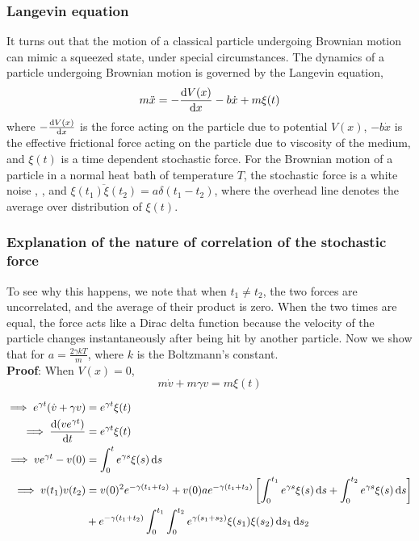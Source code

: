 \documentclass[12pt, twoside]{article}
\begin{document}
\subsubsection{Langevin equation}
It turns out that the motion of a classical particle undergoing Brownian motion can mimic a squeezed state, under special circumstances. The dynamics of a particle undergoing Brownian motion is governed by the Langevin equation,\begin{equation}\label{eq:Langevin}m \ddot{x} = -\derivative{V(x)}{x} - b \dot{x} + m \xi(t)\end{equation} where $-\derivative{V(x)}{x}$ is the force acting on the particle due to potential $V(x)$, $-b\dot{x}$ is the effective frictional force acting on the particle due to viscosity of the medium, and $\xi(t)$ is a time dependent stochastic force.
For the Brownian motion of a particle in a normal heat bath of temperature $T$, the stochastic force is a white noise \cite{wikipedia_white_noise}, \cite{brownian_motion_riemann}, and $\overline{\xi(t_1)\xi(t_2)} = a \delta(t_1 - t_2)$, where the overhead line denotes the average over distribution of $\xi(t)$.
\subsubsection{Explanation of the nature of correlation of the stochastic force}\label{fluctuation_dissipation_proof} To see why this happens, we note that when $t_1 \neq t_2$, the two forces are uncorrelated, and the average of their product is zero. When the two times are equal, the force acts like a Dirac delta function because the velocity of the particle changes instantaneously after being hit by another particle. Now we show that for $a = \frac{2 \gamma k T}{m}$, where $k$ is the Boltzmann's constant.\\
\textbf{Proof}: When $V(x) = 0$,\begin{equation}\label{eq:lang_no_pot}
	m\dot{v}+m\gamma v = m \xi(t)
\end{equation} 

$\begin{aligned}\implies e^{\gamma t}(\dot{v}+\gamma v) &= e^{\gamma t} \xi(t) \\ \implies \derivative{(ve^{\gamma t})}{t} &= e^{\gamma t} \xi(t)\\ \implies ve^{\gamma t} - v(0) &= \int_{0}^{t} e^{\gamma s} \xi(s) \dd{s} \\ \implies v(t_1) v(t_2) &= v(0)^2 e^{-\gamma(t_1 + t_2)} + v(0) a e^{-\gamma(t_1 + t_2)} \left[\int_{0}^{t_1} e^{\gamma s} \xi(s) \dd{s} + \int_{0}^{t_2} e^{\gamma s} \xi(s) \dd{s}\right] \\&+ e^{-\gamma(t_1 + t_2)} \int_{0}^{t_1}\int_{0}^{t_2} e^{\gamma(s_1 + s_2)} \xi(s_1)\xi(s_2) \dd{s_1} \dd{s_2} \end{aligned}$
\end{document}
